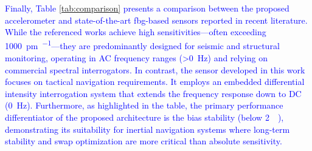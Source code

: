 \documentclass[sensors,article,accept,pdftex,moreauthors]{Definitions/mdpi}
\begin{document}
\vspace{-6pt}
\textcolor{blue}{Finally, Table \ref{tab:comparison} presents a comparison between the proposed accelerometer and state-of-the-art \gls{fbg}-based sensors reported in recent literature. While the referenced works achieve high sensitivities---often exceeding \SI{1000}{\pico\meter\per\gravity}---they are predominantly designed for seismic and structural monitoring, operating in AC frequency ranges (\SI{>0}{\hertz}) and relying on commercial spectral interrogators. In contrast, the sensor developed in this work focuses on tactical navigation requirements. It employs an embedded differential intensity interrogation system that extends the frequency response down to DC (\SI{0}{\hertz}). Furthermore, as highlighted in the table, the primary performance differentiator of the proposed architecture is the bias stability (below \SI{2}{\milli\gravity}), demonstrating its suitability for inertial navigation systems where long-term stability and \gls{swap} optimization are more critical than absolute sensitivity.}
\end{document}

